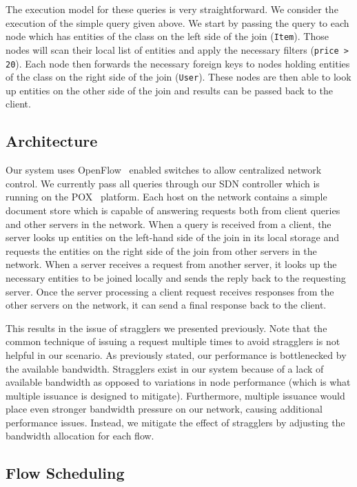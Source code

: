 \documentclass{sig-alternate-2013}
\begin{document}
The execution model for these queries is very straightforward.
We consider the execution of the simple query given above.
We start by passing the query to each node which has entities of the class on the left side of the join (\texttt{Item}).
Those nodes will scan their local list of entities and apply the necessary filters (\texttt{price > 20}).
Each node then forwards the necessary foreign keys to nodes holding entities of the class on the right side of the join (\texttt{User}).
These nodes are then able to look up entities on the other side of the join and results can be passed back to the client.

\subsection{Architecture}

Our system uses OpenFlow~\cite{McKeown2008} enabled switches to allow centralized network control.
We currently pass all queries through our SDN controller which is running on the POX~\cite{Gude2008} platform.
Each host on the network contains a simple document store which is capable of answering requests both from client queries and other servers in the network.
When a query is received from a client, the server looks up entities on the left-hand side of the join in its local storage and requests the entities on the right side of the join from other servers in the network.
When a server receives a request from another server, it looks up the necessary entities to be joined locally and sends the reply back to the requesting server.
Once the server processing a client request receives responses from the other servers on the network, it can send a final response back to the client.

This results in the issue of stragglers we presented previously.
Note that the common technique of issuing a request multiple times to avoid stragglers is not helpful in our scenario.
As previously stated, our performance is bottlenecked by the available bandwidth.
Stragglers exist in our system because of a lack of available bandwidth as opposed to variations in node performance (which is what multiple issuance is designed to mitigate).
Furthermore, multiple issuance would place even stronger bandwidth pressure on our network, causing additional performance issues.
Instead, we mitigate the effect of stragglers by adjusting the bandwidth allocation for each flow.

\subsection{Flow Scheduling}
\end{document}
